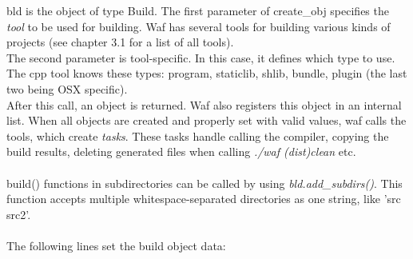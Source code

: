 \documentclass[a4,10pt]{article}
\begin{document}
bld is the object of type Build. The first parameter of create\_obj specifies the \emph{tool} to be used for building. Waf has several tools for building various kinds of projects (see chapter 3.1 for a list of all tools).\\
The second parameter is tool-specific. In this case, it defines which type to use. The cpp tool  knows these types: program, staticlib, shlib, bundle, plugin (the last two being OSX specific).\\
After this call, an object is returned. Waf also registers this object in an internal list. When all objects are created and properly set with valid values, waf calls the tools, which create \emph{tasks}. These tasks handle calling the compiler, copying the build results, deleting generated files when calling \emph{./waf (dist)clean} etc.\\
\\
build() functions in subdirectories can be called by using \emph{bld.add\_subdirs()}. This function accepts multiple whitespace-separated directories as one string, like 'src src2'.\\
\\
The following lines set the build object data:
\end{document}

